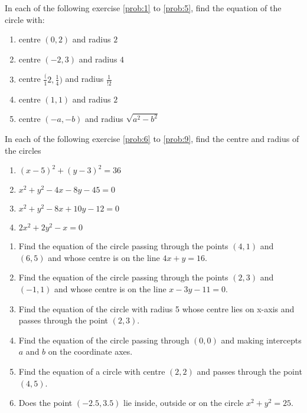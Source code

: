In each of the following exercise \ref{prob:1} to \ref{prob:5}, find the equation of the circle with:
\begin{enumerate}[label=\arabic*.,ref=\thesubsection.\theenumi]
\item centre $(0,2)$ and radius $2$ \label{prob:1}
\item centre $(-2,3)$ and radius $4$
\item centre $\frac({1}{2},\frac{1}{4})$ and radius $\frac {1}{!2}$
\item centre $(1,1)$ and radius $2$
\item centre $(-a,-b)$ and radius $\sqrt{a^2-b^2}$  \label{prob:5}
\end{enumerate}
In each of the following exercise \ref{prob:6} to \ref{prob:9}, find the centre and radius of the circles
\begin{enumerate}[resume]
\item $(x-5)^2+(y-3)^2=36$ \label{prob:6}
\item $x^2+y^2-4x-8y-45=0$
\item $x^2+y^2-8x+10y-12=0$
\item $2x^2+2y^2-x=0$ \label{prob:9}
\end{enumerate}
\begin{enumerate}[resume]
\item Find the equation of the circle passing through the points $(4,1)$ and $(6,5)$ and whose centre is on the line $4x+y=16$.
\item Find the equation of the circle passing through the points $(2,3)$ and $(-1,1)$ and whose centre is on the line $x-3y-11=0$.
\item Find the equation of the circle with radius 5 whose centre lies on x-axis and passes through the point $(2,3)$.
\item Find the equation of the circle passing through $(0,0)$ and making intercepts $a$ and $b$ on the coordinate axes.
\item Find the equation of a circle with centre $(2,2)$ and passes through the point $(4,5)$.
\item Does the point $(-2.5,3.5)$ lie inside, outside or on the circle $x^2+y^2=25$.
\end{enumerate}

